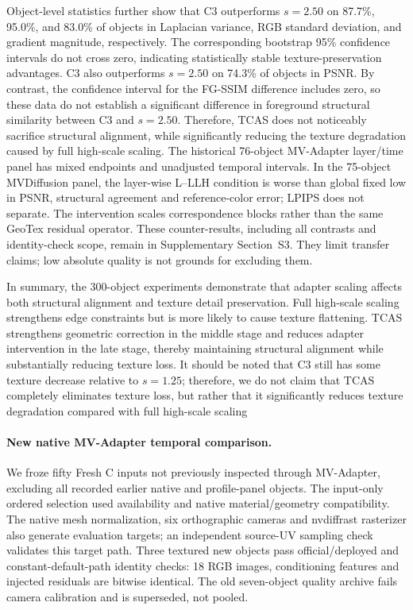 \documentclass[times,twocolumn,final]{elsarticle}
\providecommand{\DIFadd}[1]{{\protect\color{blue} \sf #1}} %
\providecommand{\DIFdel}[1]{{\protect\color{red} \scriptsize #1}} %
\providecommand{\DIFaddbegin}{} %
\providecommand{\DIFaddend}{} %
\providecommand{\DIFdelbegin}{} %
\providecommand{\DIFdelend}{} %
\begin{document}
\DIFdelbegin \DIFdel{Object-level statistics further show that C3 outperforms $s = 2.50$ on 87.7\%, 95.0\%, and 83.0\% of objects in Laplacian variance, RGB standard deviation, and gradient magnitude, respectively. The corresponding bootstrap 95\% confidence intervals do not cross zero, indicating statistically stable texture-preservation advantages.
C3 also outperforms $s = 2.50$ on 74.3\% of objects in PSNR. By contrast, the confidence interval for the FG-SSIM difference includes zero, so these data do not establish a significant difference in foreground structural similarity between C3 and $s = 2.50$. Therefore, TCAS does not noticeably sacrifice structural alignment, while significantly reducing the texture degradation caused by full high-scale scaling. }\DIFdelend \DIFaddbegin \DIFadd{The historical 76-object MV-Adapter layer/time panel has mixed endpoints and unadjusted temporal intervals. In the 75-object MVDiffusion panel, the layer-wise L--LLH condition is worse than global fixed low in PSNR, structural agreement and reference-color error; LPIPS does not separate. The intervention scales correspondence blocks rather than the same GeoTex residual operator. These counter-results, including all contrasts and identity-check scope, remain in Supplementary Section~S3. They limit transfer claims; low absolute quality is not grounds for excluding them.
}\DIFaddend 

\DIFdelbegin \DIFdel{In summary, the 300-object experiments demonstrate that adapter scaling affects both structural alignment and texture detail preservation. Full high-scale scaling strengthens edge constraints but is more likely to cause texture flattening. TCAS strengthens geometric correction in the middle stage and reduces adapter intervention in the late stage, thereby maintaining structural alignment while substantially reducing texture loss. It should be noted that C3 still has some texture decrease relative to $s = 1.25$; therefore, we do not claim that TCAS completely eliminates texture loss, but rather that it significantly reduces texture degradation compared with full high-scale scaling}\DIFdelend \DIFaddbegin \paragraph{New native MV-Adapter temporal comparison.}
\label{subsec:new-mva}
\DIFadd{We froze fifty Fresh C inputs not previously inspected through MV-Adapter, excluding all recorded earlier native and profile-panel objects. The input-only ordered selection used availability and native material/geometry compatibility. The native mesh normalization, six orthographic cameras and nvdiffrast rasterizer also generate evaluation targets; an independent source-UV sampling check validates this target path. Three textured new objects pass official/deployed and constant-default-path identity checks: 18 RGB images, conditioning features and injected residuals are bitwise identical. The old seven-object quality archive fails camera calibration and is superseded, not pooled}\DIFaddend .
\end{document}
